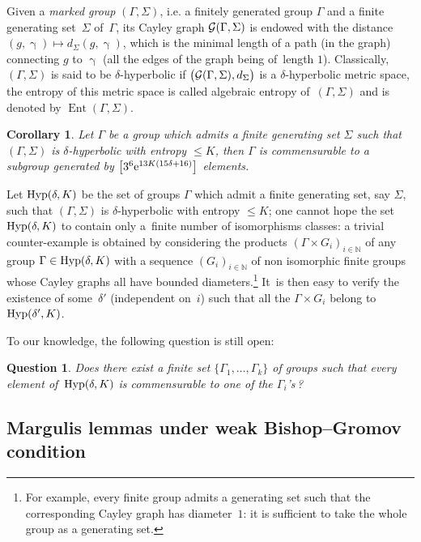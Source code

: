 \documentclass[pdftex]{sigma}
\numberwithin{equation}{section}
\newtheorem{Corollary}[theor]{Corollary}
\newtheorem{question}[theor]{Question}
\newcommand{\N}{\mathbb{N}}
\newcommand{\Ent}{\operatorname{Ent}}
\newcommand{\g}{\operatorname{\gamma}}
\begin{document}
Given a \emph{marked group} $(\Gamma, \Sigma)$, i.e. a finitely generated group $\Gamma$ and a finite generating set~$\Sigma$ of~$\Gamma$, its Cayley
graph ${\cal G} (\Gamma, \Sigma)$ is endowed with the distance $(g, \g) \mapsto d_\Sigma (g, \g)$, which is the minimal length of a path (in the graph) connecting
$g$ to $\g$ (all the edges of the graph being of~length $1$).
Classically, $ (\Gamma, \Sigma)$ is said to be $\delta$-hyperbolic if $\big({\cal G} (\Gamma, \Sigma), d_\Sigma \big)$ is a $\delta$-hyperbolic metric space, the entropy of
this metric space is called algebraic entropy of~$ (\Gamma, \Sigma)$ and is denoted by $\Ent (\Gamma, \Sigma)$.

\begin{Corollary}%
Let $\Gamma$ be a group which admits a finite generating set $\Sigma$ such that $ (\Gamma, \Sigma)$ is $\delta$-hy\-per\-bolic with entropy $\le K$, then
$\Gamma$ is commensurable to a subgroup generated by $\big[ 3^6 {\rm e}^{13 K
(15 \delta + 16)}\big]$ elements.
\end{Corollary}

Let ${\rm Hyp} (\delta, K)$ be the set of groups $\Gamma$ which admit a finite generating set, say $\Sigma$, such that $ (\Gamma, \Sigma)$ is
$\delta$-hyperbolic with entropy $\le K$; one cannot hope the set ${\rm Hyp} (\delta, K)$ to contain only a~finite number of isomorphisms classes: a trivial counter-example is obtained by considering the products $(\Gamma \times G_i)_{i \in \N}$ of any group $\Gamma \in {\rm Hyp} (\delta, K)$ with a sequence $(G_i)_{i \in \N}$ of non isomorphic finite groups whose Cayley graphs all have bounded diameters.\footnote{For example, every
finite group admits a generating
set such that the corresponding Cayley graph has diameter~$1$: it is sufficient to
take the whole group as a generating set.} It~is then easy to verify the
existence of some~$\delta'$ (independent on~$i$) such that all the $\Gamma \times G_i$ belong to ${\rm Hyp} (\delta', K)$.

To our knowledge, the following question is still open:
\begin{question}
Does there exist a finite set $\{\Gamma_1, \dots, \Gamma_k \}$ of groups such that every element of~${\rm Hyp} (\delta, K)$ is commensurable to one
of the $\Gamma_i$'s\,?
\end{question}

\subsection{Margulis lemmas under weak Bishop--Gromov condition}\label{MargLemme0}
\end{document}
